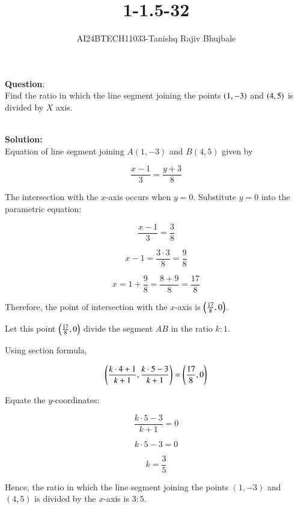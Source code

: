\documentclass[journal]{IEEEtran}
\begin{document}

\vspace{3cm}

\title{1-1.5-32}
\author{AI24BTECH11033-Tanishq Rajiv Bhujbale}
{\let\newpage\relax\maketitle}

\renewcommand{\thefigure}{\theenumi}
\renewcommand{\thetable}{\theenumi}
\setlength{\intextsep}{10pt} %


\renewcommand{\thetable}{\theenumi}


\textbf{Question}:\\
Find the ratio in which the line segment joining the points $\left(1,-3\right)$ and $\left(4, 5\right)$ is divided by $X$ axis.

\\
\textbf{Solution: }\\


Equation of line segment joining $A(1,-3)$ and $B(4,5)$ given by

   $$\frac{x-1}{3}=\frac{y+3}{8}$$

   The intersection with the $x$-axis occurs when $y=0$. Substitute $y=0$ into the parametric equation:

   $$\frac{x-1}{3}=\frac{3}{8}$$

   $$x-1=\frac{3 \cdot 3}{8}=\frac{9}{8}$$

   $$x=1+\frac{9}{8}=\frac{8+9}{8}=\frac{17}{8}$$

   Therefore, the point of intersection with the $x$-axis is $\left(\frac{17}{8}, 0\right)$.

   Let this point $\left(\frac{17}{8},0\right)$ divide the segment $AB$ in the ratio $k:1$. 
   
   Using section formula, 

   $$\left(\frac{k \cdot 4+1}{k+1},\frac{k \cdot 5-3}{k+1}\right)=\left(\frac{17}{8},0\right)$$

   Equate the $y$-coordinates:

   $$\frac{k \cdot 5-3}{k+1}=0$$

   $$k \cdot 5-3=0$$

   $$k=\frac{3}{5}$$

   Hence, the ratio in which the line segment joining the points $(1,-3)$ and $(4,5)$ is divided by the $x$-axis is $3:5$.
\end{document}
